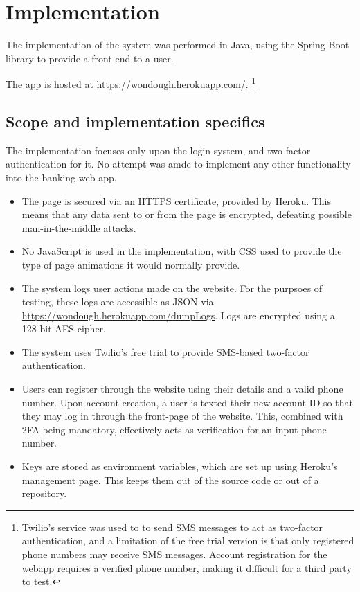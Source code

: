 \section{Implementation}

The implementation of the system was performed in Java, using the Spring Boot library to provide a front-end to a user. 

The app is hosted at \url{https://wondough.herokuapp.com/}. \footnote{
    Twilio's service was used to to send SMS messages to act as two-factor authentication, and a limitation of the free trial version is that only registered phone numbers may receive SMS messages. Account registration for the webapp requires a verified phone number, making it difficult for a third party to test.
}

\subsection{Scope and implementation specifics}

The implementation focuses only upon the login system, and two factor authentication for it. No attempt was amde to implement any other functionality into the banking web-app.

\begin{itemize}

    \item The page is secured via an HTTPS certificate, provided by Heroku. This means that any data sent to or from the page is encrypted, defeating possible man-in-the-middle attacks. 

    \item No JavaScript is used in the implementation, with CSS used to provide the type of page animations it would normally provide. 

    \item The system logs user actions made on the website. For the purpsoes of testing, these logs are accessible as JSON via \url{https://wondough.herokuapp.com/dumpLogs}. Logs are encrypted using a 128-bit AES cipher. 

    \item The system uses Twilio's free trial to provide SMS-based two-factor authentication. 

    \item Users can register through the website using their details and a valid phone number. Upon account creation, a user is texted their new account ID so that they may log in through the front-page of the website. This, combined with 2FA being mandatory, effectively acts as verification for an input phone number.

    \item Keys are stored as environment variables, which are set up using Heroku's management page. This keeps them out of the source code or out of a repository. 

\end{itemize}

